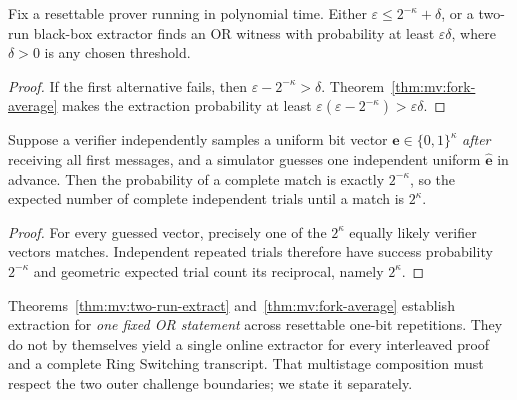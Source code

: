 \begin{corollary}\label{cor:mv:knowledge-error}
Fix a resettable prover running in
polynomial time. Either
$\varepsilon\le2^{-\kappa}+\delta$,
or a two-run black-box extractor
finds an OR witness with probability
at least $\varepsilon\delta$,
where $\delta>0$ is any chosen
threshold.
\end{corollary}
\begin{proof}
If the first alternative fails,
then $\varepsilon-2^{-\kappa}>\delta$.
Theorem~\ref{thm:mv:fork-average}
makes the extraction probability
at least
$\varepsilon(\varepsilon-2^{-\kappa})
>\varepsilon\delta$.
\end{proof}

\begin{lemma}\label{lem:mv:parallel-cost}
Suppose a verifier independently
samples a uniform bit vector
$\mathbf e\in\{0,1\}^{\kappa}$
\emph{after} receiving all first
messages, and a simulator guesses
one independent uniform
$\widehat{\mathbf e}$ in advance.
Then the probability of a complete
match is exactly $2^{-\kappa}$,
so the expected number of complete
independent trials until a match
is $2^\kappa$.
\end{lemma}
\begin{proof}
For every guessed vector, precisely
one of the $2^\kappa$ equally likely
verifier vectors matches.
Independent repeated trials
therefore have success probability
$2^{-\kappa}$ and geometric
expected trial count its reciprocal,
namely $2^\kappa$.
\end{proof}

\begin{remark}
Theorems~\ref{thm:mv:two-run-extract}
and~\ref{thm:mv:fork-average}
establish extraction for \emph{one fixed
OR statement} across resettable
one-bit repetitions. They do not
by themselves yield a single
online extractor for every
interleaved proof and a complete
Ring Switching transcript.
That multistage composition must
respect the two outer challenge
boundaries; we state it separately.
\end{remark}
